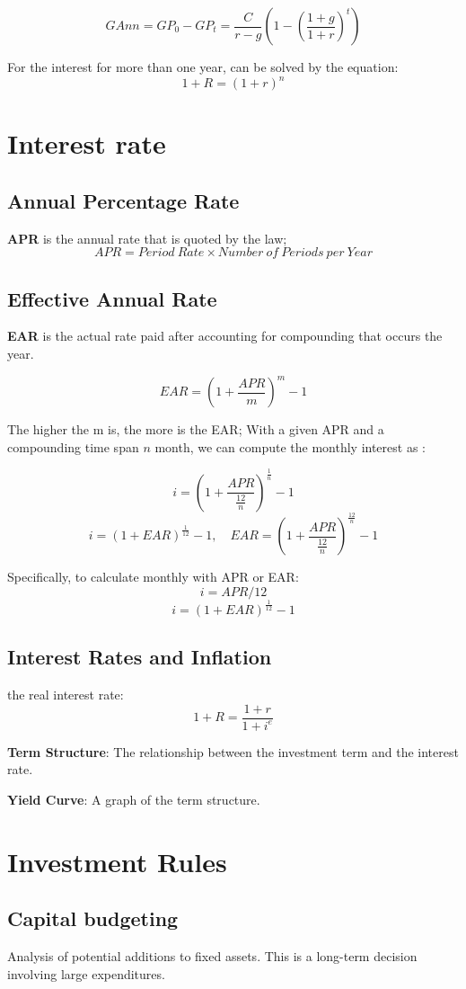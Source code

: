 \documentclass[10pt, a4paper]{article}
\begin{document}
        $$GAnn = GP_0 - GP_t = \frac{C}{r - g}(1 - (\frac{1 + g}{1 + r})^t)$$

        For the interest for more than one year, can be solved by the equation:
        $$1 + R = (1 + r) ^ n$$

\section{Interest rate}
    \subsection{Annual Percentage Rate}
        \textbf{APR} is the annual rate that is quoted by the law; 
            $$APR = Period\ Rate \times Number\ of\ Periods\ per\ Year$$
    \subsection{Effective Annual Rate}
        \textbf{EAR} is the actual rate paid after accounting for compounding that occurs the year.
        
        $$EAR = (1 + \frac{APR}{m})^m - 1$$

        The higher the m is, the more is the EAR; With a given APR and a compounding time span $n$ month, we can compute the monthly interest as :

        $$i = (1 + \frac{APR}{\frac{12}{n}}) ^{\frac{1}{n}} - 1$$
        $$i = (1 + EAR) ^{\frac{1}{12}} - 1,\quad EAR = (1 + \frac{APR}{\frac{12}{n}})^{\frac{12}{n}} - 1$$

        Specifically, to calculate monthly with APR or EAR: 
        $$i = APR / 12$$
        $$i = (1 + EAR) ^ {\frac{1}{12}} - 1$$


    \subsection{Interest Rates and Inflation}
        the real interest rate:
        $$1 + R = \frac{1 + r}{1 + i^e}$$

        \textbf{Term Structure}: The relationship between the investment term and the interest rate.

        \textbf{Yield Curve}: A graph of the term structure.

    \section{Investment Rules}
        \subsection{Capital budgeting}
            Analysis of potential additions to fixed assets. This is a long-term decision involving large expenditures.
            
\end{document}
